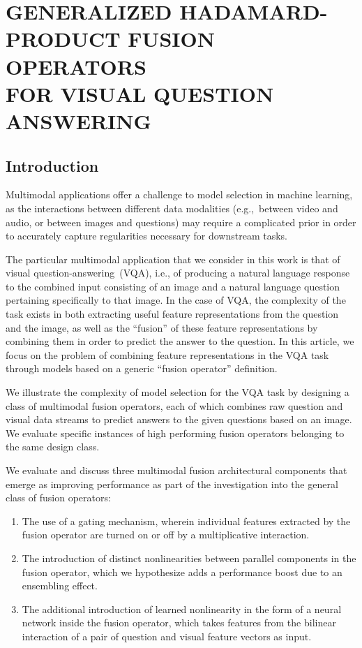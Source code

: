 \chapter{GENERALIZED HADAMARD-PRODUCT FUSION OPERATORS \\
         FOR VISUAL QUESTION ANSWERING}


\section{Introduction}

Multimodal applications offer a challenge to model selection in machine
learning, as the interactions between different data modalities (e.g.,~between
video and audio, or between images and questions) may require a complicated
prior in order to accurately capture regularities necessary for downstream tasks.

The particular multimodal application that we consider in this work is that of
visual question-answering~(VQA), i.e., of producing a natural language response
to the combined input consisting of an image and a natural language question
pertaining specifically to that image. In the case of VQA, the complexity of
the task exists in both extracting useful feature representations from the
question and the image, as well as the ``fusion'' of these feature
representations by combining them in order to predict the answer to the
question. In this article, we focus on the problem of combining feature
representations in the VQA task through models based on a generic ``fusion
operator'' definition.

We illustrate the complexity of model selection for the VQA task by designing a
class of multimodal fusion operators, each of which combines raw question and
visual data streams to predict answers to the given questions based on an
image. We evaluate specific instances of high performing fusion operators
belonging to the same design class.

We evaluate and discuss three multimodal fusion architectural components that
emerge as improving performance as part of the investigation into the general
class of fusion operators:

\begin{enumerate}
        \item The use of a gating mechanism, wherein individual features
                extracted by the fusion operator are turned on or off by a
                multiplicative interaction.

        \item The introduction of distinct nonlinearities between parallel
                components in the fusion operator, which we hypothesize adds a
                performance boost due to an ensembling effect.

        \item The additional introduction of learned nonlinearity in the form
                of a neural network inside the fusion operator, which takes
                features from the bilinear interaction of a pair of question
                and visual feature vectors as input.
\end{enumerate}


